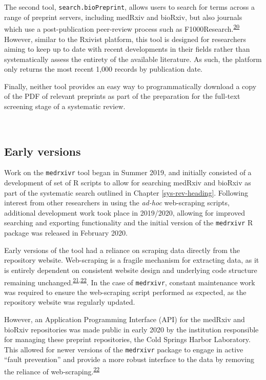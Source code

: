 \documentclass[a4paper, twoside]{templates/ociamthesis}
\begin{document}
The second tool, \texttt{search.bioPreprint}, allows users to search for terms across a range of preprint servers, including medRxiv and bioRxiv, but also journals which use a post-publication peer-review process such as F1000Research.\textsuperscript{\protect\hyperlink{ref-iwema2016}{20}} However, similar to the Rxivist platform, this tool is designed for researchers aiming to keep up to date with recent developments in their fields rather than systematically assess the entirety of the available literature. As such, the platform only returns the most recent 1,000 records by publication date.

Finally, neither tool provides an easy way to programmatically download a copy of the PDF of relevant preprints as part of the preparation for the full-text screening stage of a systematic review.

~

\hypertarget{early-versions}{%
\subsection{Early versions}\label{early-versions}}

Work on the \texttt{medrxivr} tool began in Summer 2019, and initially consisted of a development of set of R scripts to allow for searching medRxiv and bioRxiv as part of the systematic search outlined in Chapter \ref{sys-rev-heading}. Following interest from other researchers in using the \emph{ad-hoc} web-scraping scripts, additional development work took place in 2019/2020, allowing for improved searching and exporting functionality and the initial version of the \texttt{medrxivr} R package was released in February 2020.

Early versions of the tool had a reliance on scraping data directly from the repository website. Web-scraping is a fragile mechanism for extracting data, as it is entirely dependent on consistent website design and underlying code structure remaining unchanged.\textsuperscript{\protect\hyperlink{ref-shaw2002}{21},\protect\hyperlink{ref-laprie1992}{22}}. In the case of \texttt{medrxivr}, constant maintenance work was required to ensure the web-scraping script performed as expected, as the repository website was regularly updated.

However, an Application Programming Interface (API) for the medRxiv and bioRxiv repositories was made public in early 2020 by the institution responsible for managing these preprint repositories, the Cold Springs Harbor Laboratory. This allowed for newer versions of the \texttt{medrxivr} package to engage in active ``fault prevention'' and provide a more robust interface to the data by removing the reliance of web-scraping.\textsuperscript{\protect\hyperlink{ref-laprie1992}{22}}
\end{document}
